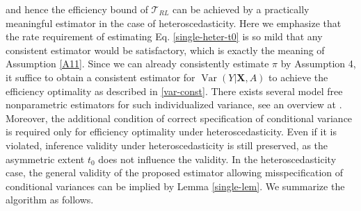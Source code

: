 \documentclass[11pt]{article}
\theoremstyle{referenceplain}
\theoremstyle{referencedefinition}
\theoremstyle{referenceremark}
\begin{document}
and hence the efficiency bound of $\mathcal{T}_{RL}$ can be achieved by a practically meaningful estimator in the case of heteroscedasticity. Here we emphasize that the rate requirement of estimating Eq. \eqref{single-heter-t0} is so mild that any consistent estimator would be satisfactory, which is exactly the meaning of Assumption \ref{A11}. Since we can already consistently estimate $\pi$ by Assumption 4, it suffice to obtain a consistent estimator for $\operatorname{Var}(Y|\mathbf{X},A)$ to achieve the efficiency optimality as described in \ref{var-const}. There exists several model free nonparametric estimators for such individualized variance, see an overview at \citet{chu2020standard}. Moreover, the additional condition of correct specification of conditional variance is required only for efficiency optimality under heteroscedasticity. Even if it is violated, inference validity under heteroscedasticity is still preserved, as the asymmetric extent $t_0$ does not influence the validity. In the heteroscedasticity case, the general validity of the proposed estimator allowing misspecification of conditional variances can be implied by Lemma \ref{single-lem}.  We summarize the algorithm as follows. 
\end{document}
